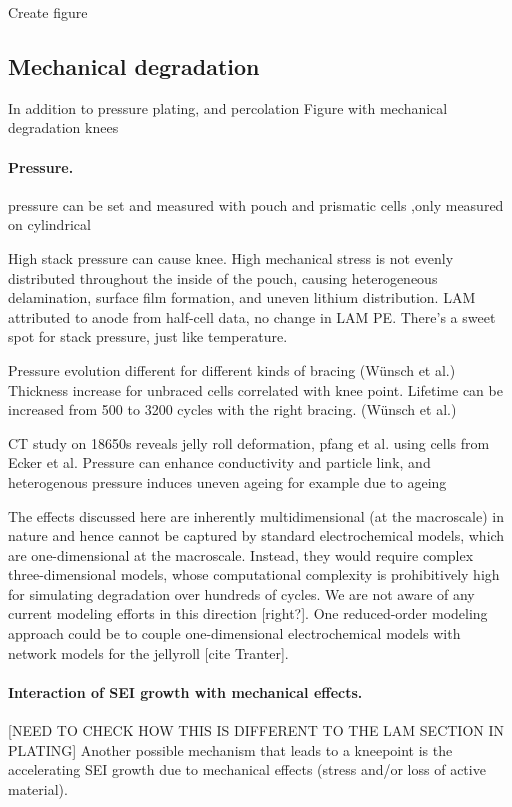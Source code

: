 \documentclass{article}
\begin{document}
Create figure

\subsection{Mechanical degradation}
In addition to pressure plating, and percolation 
Figure with mechanical degradation knees
\paragraph{Pressure.}
pressure can be set and measured with pouch \cite{wunsch_investigation_2019} and prismatic cells\cite{cannarella_stress_2014} ,only measured on cylindrical \cite{willenberg_high-precision_2020}

High stack pressure can cause knee. High mechanical stress is not evenly distributed throughout the inside of the pouch, causing heterogeneous delamination, surface film formation, and uneven lithium distribution. LAM attributed to anode from half-cell data, no change in LAM PE. There's a sweet spot for stack pressure, just like temperature.\cite{cannarella_stress_2014}

Pressure evolution different for different kinds of bracing (Wünsch et al.) Thickness increase for unbraced cells correlated with knee point. Lifetime can be increased from 500 to 3200 cycles with the right bracing. (Wünsch et al.)

CT study on 18650s reveals jelly roll deformation, pfang et al. \cite{pfrang_long-term_2018} using cells from Ecker et al. \cite{ecker_calendar_2014}
Pressure can enhance conductivity and particle link, and heterogenous pressure induces uneven ageing for example due to ageing \cite{bach_nonlinear_2016}

The effects discussed here are inherently multidimensional (at the macroscale) in nature and hence cannot be captured by standard electrochemical models, which are one-dimensional at the macroscale. Instead, they would require complex three-dimensional models, whose computational complexity is prohibitively high for simulating degradation over hundreds of cycles. We are not aware of any current modeling efforts in this direction [right?]. One reduced-order modeling approach could be to couple one-dimensional electrochemical models with network models for the jellyroll [cite Tranter].

\paragraph{Interaction of SEI growth with mechanical effects.} [NEED TO CHECK HOW THIS IS DIFFERENT TO THE LAM SECTION IN PLATING]
Another possible mechanism that leads to a kneepoint is the accelerating SEI growth due to mechanical effects (stress and/or loss of active material).
\end{document}
